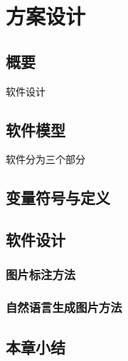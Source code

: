 
\chapter{方案设计}

\section{概要}
软件设计

\section{软件模型}
软件分为三个部分

\section{变量符号与定义}

\section{软件设计}

\subsection{图片标注方法}

\subsection{自然语言生成图片方法}

\section{本章小结}




